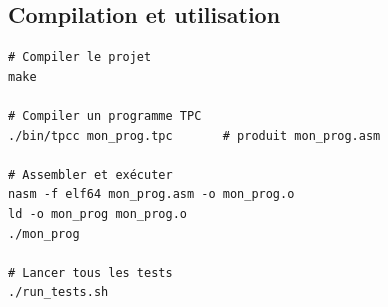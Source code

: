\documentclass[12pt,a4paper]{article}
\begin{document}
\subsection{Compilation et utilisation}

\begin{verbatim}
# Compiler le projet
make

# Compiler un programme TPC
./bin/tpcc mon_prog.tpc       # produit mon_prog.asm

# Assembler et exécuter
nasm -f elf64 mon_prog.asm -o mon_prog.o
ld -o mon_prog mon_prog.o
./mon_prog

# Lancer tous les tests
./run_tests.sh

\end{verbatim}
\end{document}
